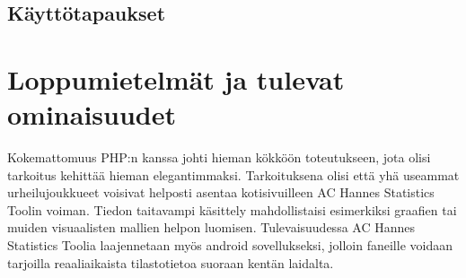 \documentclass[12pt]{article} %
\begin{document}


\subsection{Käyttötapaukset}
\section{Loppumietelmät ja tulevat ominaisuudet} %
Kokemattomuus PHP:n kanssa johti hieman kökköön toteutukseen, jota olisi tarkoitus kehittää hieman elegantimmaksi. Tarkoituksena olisi että yhä useammat urheilujoukkueet voisivat helposti asentaa kotisivuilleen AC Hannes Statistics Toolin voiman. Tiedon taitavampi käsittely mahdollistaisi esimerkiksi graafien tai muiden visuaalisten mallien helpon luomisen. Tulevaisuudessa AC Hannes Statistics Toolia laajennetaan myös android sovellukseksi, jolloin faneille voidaan tarjoilla reaaliaikaista tilastotietoa suoraan kentän laidalta.


\begin{thebibliography}{99} %
\end{thebibliography}

\end{document}
